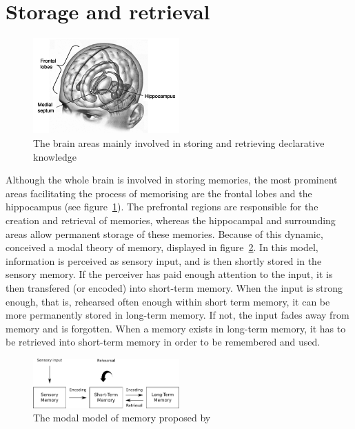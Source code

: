 \section{Storage and retrieval}

\begin{figure}
    \centering
    \includegraphics[width=0.5\textwidth]{img/brainareas.png}
    \caption{The brain areas mainly involved in storing and retrieving declarative knowledge \protect\cite{amnesia}}
    \label{fig:brainareas}
\end{figure}

Although the whole brain is involved in storing memories, the most prominent areas facilitating the process of memorising are the frontal lobes and the hippocampus \cite{cognitivepsychology} (see figure~\ref{fig:brainareas}). The prefrontal regions are responsible for the creation and retrieval of memories, whereas the hippocampal and surrounding areas allow permanent storage of these memories. Because of this dynamic,  conceived a modal theory of memory, displayed in figure~\ref{fig:modalmemory}. In this model, information is perceived as sensory input, and is then shortly stored in the sensory memory. If the perceiver has paid enough attention to the input, it is then transfered (or encoded) into short-term memory. When the input is strong enough, that is, rehearsed often enough within short term memory, it can be more permanently stored in long-term memory. If not, the input fades away from memory and is forgotten. When a memory exists in long-term memory, it has to be retrieved into short-term memory in order to be remembered and used.

\begin{figure}
    \centering
    \includegraphics[width=0.5\textwidth]{img/modalmemory.png}
    \caption{The modal model of memory proposed by \protect{}}
    \label{fig:modalmemory}
\end{figure}

